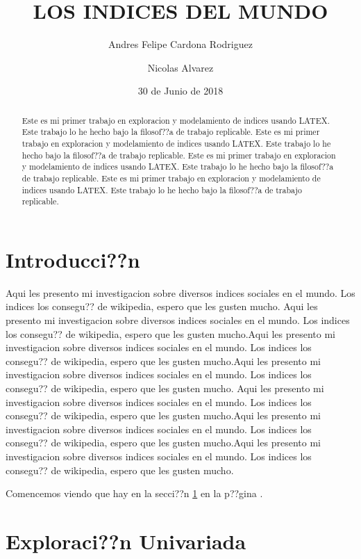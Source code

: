 \documentclass{article}
\title{LOS INDICES DEL MUNDO}
\author[1]{\normalsize Andres Felipe Cardona Rodriguez}
\author[2]{\normalsize Nicolas Alvarez}
\affil[1,2]{\small  Escuela de Ingenier??a,Universidad de los Andes\\
\texttt{{delcurso,deallado}@uniandes.edu.col}}
\affil[1]{\small Instituto de altas investigaciones financieras\\
Banco del Parque\\
\texttt{delcurso@bp.com.col}}
\date{30 de Junio de 2018}
\begin{document}


\maketitle


\begin{abstract}
Este es mi primer trabajo en exploracion y modelamiento de indices usando LATEX. Este trabajo lo he hecho bajo la filosof??a de trabajo replicable. Este es mi primer trabajo en exploracion y modelamiento de indices usando LATEX. Este trabajo lo he hecho bajo la filosof??a de trabajo replicable. Este es mi primer trabajo en exploracion y modelamiento de indices usando LATEX. Este trabajo lo he hecho bajo la filosof??a de trabajo replicable. Este es mi primer trabajo en exploracion y modelamiento de indices usando LATEX. Este trabajo lo he hecho bajo la filosof??a de trabajo replicable.
\end{abstract}

\section*{Introducci??n}

Aqui les presento mi investigacion sobre diversos indices sociales en el mundo. Los indices los consegu?? de wikipedia, espero que les gusten mucho. Aqui les presento mi investigacion sobre diversos indices sociales en el mundo. Los indices los consegu?? de wikipedia, espero que les gusten mucho.Aqui les presento mi investigacion sobre diversos indices sociales en el mundo. Los indices los consegu?? de wikipedia, espero que les gusten mucho.Aqui les presento mi investigacion sobre diversos indices sociales en el mundo. Los indices los consegu?? de wikipedia, espero que les gusten mucho.
Aqui les presento mi investigacion sobre diversos indices sociales en el mundo. Los indices los consegu?? de wikipedia, espero que les gusten mucho.Aqui les presento mi investigacion sobre diversos indices sociales en el mundo. Los indices los consegu?? de wikipedia, espero que les gusten mucho.Aqui les presento mi investigacion sobre diversos indices sociales en el mundo. Los indices los consegu?? de wikipedia, espero que les gusten mucho.

Comencemos viendo que hay en la secci??n \ref{univariada} en la p??gina \pageref{univariada}.

\clearpage



\section{Exploraci??n Univariada}\label{univariada}
\end{document}
